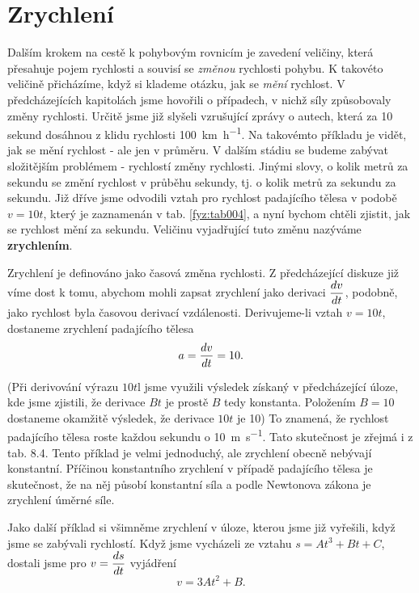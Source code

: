 {  \section{Zrychlení}
    Dalším krokem na cestě k pohybovým rovnicím je zavedení veličiny, která přesahuje pojem 
    rychlosti a souvisí se \emph{změnou} rychlosti pohybu. K takovéto veličině přicházíme, když si 
    klademe otázku, jak se \emph{mění} rychlost. V předcházejících kapitolách jsme hovořili o 
    případech, v nichž síly způsobovaly změny rychlosti. Určitě jsme již slyšeli vzrušující zprávy 
    o autech, která za \num{10} sekund dosáhnou z klidu rychlosti \SI{100}{km\per\hour}. Na 
    takovémto příkladu je vidět, jak se mění rychlost - ale jen v průměru. V dalším stádiu se 
    budeme zabývat složitějším problémem - rychlostí změny rychlosti. Jinými slovy, o kolik metrů 
    za sekundu se změní rychlost v průběhu sekundy, tj. o kolik metrů za sekundu za sekundu. Již 
    dříve jsme odvodili vztah pro rychlost padajícího tělesa v podobě \(v= 10 t\), který je 
    zaznamenán v tab. \ref{fyz:tab004}, a nyní bychom chtěli zjistit, jak se rychlost mění za 
    sekundu. Veličinu vyjadřující tuto změnu nazýváme \textbf{zrychlením}.
    
    Zrychlení je definováno jako časová změna rychlosti. Z předcházející diskuze již víme dost k 
    tomu, abychom mohli zapsat zrychlení jako derivaci \(\dfrac{d v}{d t}\), podobně, jako rychlost byla 
    časovou derivací vzdálenosti. Derivujeme-li vztah \(v= 10t\), dostaneme zrychlení padajícího 
    tělesa
    \begin{equation}\label{FYZ:eq101}
      a = \dfrac{d v}{d t} = 10.
    \end{equation}
    
    (Při derivování výrazu \(10t\)l jsme využili výsledek získaný v předcházející úloze, kde jsme 
    zjistili, že derivace \(Bt\) je prostě \(B\) tedy konstanta. Položením \(B=10\) dostaneme 
    okamžitě výsledek, že derivace \(10t\) je \num{10}) To znamená, že rychlost padajícího tělesa 
    roste každou sekundu o \SI{10}{\m\per\s}. Tato skutečnost je zřejmá i z tab. 8.4. Tento příklad 
    je velmi jednoduchý, ale zrychlení obecně nebývají konstantní. Příčinou konstantního zrychlení 
    v případě padajícího tělesa je skutečnost, že na něj působí konstantní síla a podle Newtonova 
    zákona je zrychlení úměrné síle.
    
    Jako další příklad si všimněme zrychlení v úloze, kterou jsme již vyřešili, když jsme se 
    zabývali rychlostí. Když jsme vycházeli ze vztahu \(s = At^3 + Bt + C\), dostali jsme pro 
    \(v=\dfrac{d s}{d t}\) vyjádření
    \begin{equation}\label{FYZ:eq102}
      v = 3At^2 + B.
    \end{equation}
    
}
